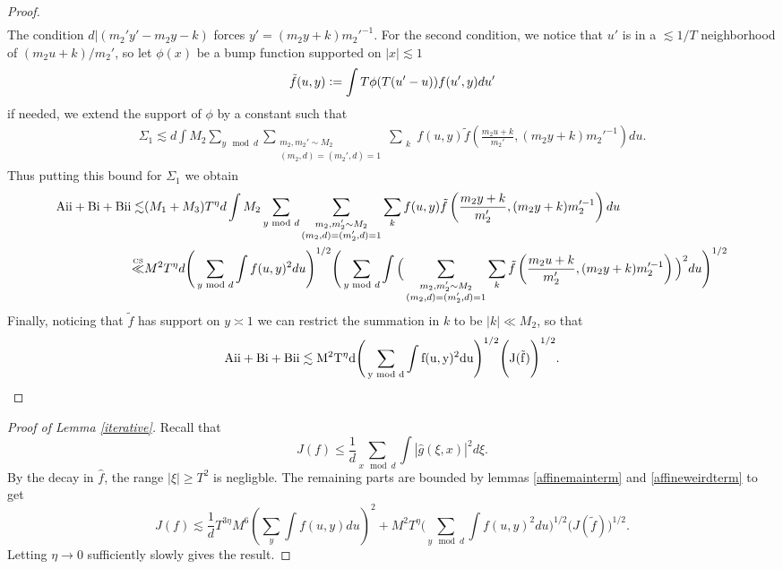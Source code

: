 \begin{proof}
\begin{align*}
     \end{align*}
    The condition $d|(m_2'y'-m_2y-k)$ forces $y'= (m_2y+k)m_2'^{-1}$.
    For the second condition, we notice that $u'$ is in a $\lesssim 1/T$ neighborhood of $(m_2u+k)/m_2'$, so let $\phi(x)$ be a bump function supported on $|x|\lesssim 1$ \[
    \tilde{f}(u,y) \defeq \int T \phi(T(u'-u)) f(u',y) du'
    \]
    if needed, we extend the support of $\phi$ by a constant such that 
    \begin{align*}
        \Sigma_1\lesssim
        d \int  {M_2} \sum_{y\mod d}\sum_{\substack{m_2,m_2'\sim M_2\\(m_2,d)=(m_2',d)=1
        }} \sum_{\substack{k}}  f(u,y) \tilde{f}\left(\frac{m_2u+k}{m_2'},(m_2y+k)m_2'^{-1}\right)  du.
     \end{align*}
     Thus putting this bound for $\Sigma_1$ we obtain
     \begin{align*}
        \rm{Aii}+{Bi}+{Bii}\lesssim& (M_1+M_3)T^{\eta} d \int  {M_2} \sum_{y\mod d}\sum_{\substack{m_2,m_2'\sim M_2\\(m_2,d)=(m_2',d)=1
        }} \sum_{\substack{k}}  f(u,y) \tilde{f}\left(\frac{m_2y+k}{m_2'},(m_2y+k)m_2'^{-1}\right)  du\\
        \stackon{CS}{\ll}& M^2T^{\eta}d \Bigg(\sum_{y\mod d}\int f(u,y)^2 du \Bigg) ^{1/2}
        \Bigg(\sum_{y\mod d} \int \Big(\sum_{\substack{m_2,m_2'\sim M_2\\(m_2,d)=(m_2',d)=1
        }} \sum_{\substack{k}} \tilde{f}\left(\frac{m_2u+k}{m_2'},(m_2y+k)m_2'^{-1}\right)\Big)^2 du\Bigg) ^{1/2}
    \end{align*}
    Finally, noticing that $\tilde{f}$ has support on $y\asymp 1$ we can restrict the summation in $k$ to be $|k|\ll M_2$, so that 
    \begin{align*}
        \rm{Aii}+{Bi}+{Bii}\lesssim M^2T^{\eta}d \Bigg(\sum_{y\mod d}\int f(u,y)^2 du \Bigg) ^{1/2}
        \Bigg(J(\tilde{f})\Bigg) ^{1/2}.
    \end{align*}
\end{proof}
\begin{proof}[Proof of Lemma \ref{iterative}]
    Recall that\[
J(f)\leq \frac{1}{d}\sum_{x\mod d} \int |\hat{g}(\xi,x)|^2 d\xi.
\]
By the decay in $\hat{f}$, the range $|\xi|\geq T^2$ is negligble. The remaining parts are bounded by lemmas \ref{affinemainterm} and \ref{affineweirdterm} to get \[
J(f)\lesssim \frac{1}{d}T^{3\eta}M^6\left(\sum_y \int f(u,y) du\right)^2+ M^2T^{\eta} \Bigg(\sum_{y\mod d}\int f(u,y)^2 du \Bigg) ^{1/2}
\Bigg(J(\tilde{f})\Bigg) ^{1/2}.
\]
Letting $\eta \to 0$ sufficiently slowly gives the result.
\end{proof}


